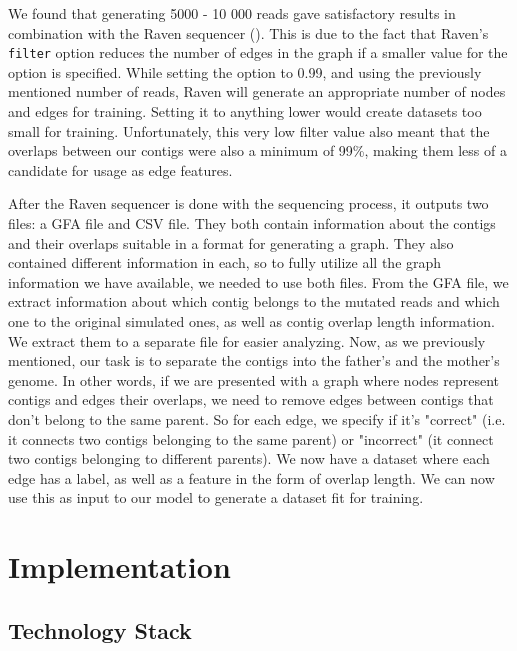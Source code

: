 \documentclass[times, utf8, diplomski, english]{fer_eng}
\begin{document}
We found that generating 5000 - 10 000 reads gave satisfactory results in combination with the Raven sequencer (\cite{Vaser}). This is due to the fact that Raven's \texttt{filter} option reduces the number of edges in the graph if a smaller value for the option is specified. While setting the option to 0.99, and using the previously mentioned number of reads, Raven will generate an appropriate number of nodes and edges for training. Setting it to anything lower would create datasets too small for training. Unfortunately, this very low filter value also meant that the overlaps between our contigs were also a minimum of 99\%, making them less of a candidate for usage as edge features.

After the Raven sequencer is done with the sequencing process, it outputs two files: a GFA file and CSV file. They both contain information about the contigs and their overlaps suitable in a format for generating a graph. They also contained different information in each, so to fully utilize all the graph information we have available, we needed to use both files. From the GFA file, we extract information about which contig belongs to the mutated reads and which one to the original simulated ones, as well as contig overlap length information. We extract them to a separate file for easier analyzing. Now, as we previously mentioned, our task is to separate the contigs into the father's and the mother's genome. In other words, if we are presented with a graph where nodes represent contigs and edges their overlaps, we need to remove edges between contigs that don't belong to the same parent. So for each edge, we specify if it's "correct" (i.e. it connects two contigs belonging to the same parent) or "incorrect" (it connect two contigs belonging to different parents). We now have a dataset where each edge has a label, as well as a feature in the form of overlap length. We can now use this as input to our model to generate a dataset fit for training.

\chapter{Implementation}

\section{Technology Stack}
\end{document}
